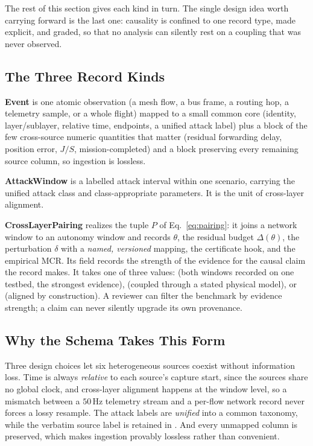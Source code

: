 The rest of this section gives each kind in turn. The single design idea worth
carrying forward is the last one: causality is confined to one record type, made
explicit, and graded, so that no analysis can silently rest on a coupling that
was never observed.

\subsection{The Three Record Kinds}
\textbf{Event} is one atomic observation (a mesh flow, a bus frame, a routing
hop, a telemetry sample, or a whole flight) mapped to a small common core
(identity, layer/sublayer, relative time, endpoints, a unified attack label)
plus a  block of the few cross-source numeric quantities that
matter (residual forwarding delay, position error, $J/S$, mission-completed) and
a  block preserving every remaining source column, so ingestion is
lossless.

\textbf{AttackWindow} is a labelled attack interval within one scenario,
carrying the unified attack class and class-appropriate 
parameters. It is the unit of cross-layer alignment.

\textbf{CrossLayerPairing} realizes the tuple $P$ of Eq.~\eqref{eq:pairing}: it
joins a network window to an autonomy window and records $\theta$, the residual
budget $\Delta(\theta)$, the perturbation $\delta$ with a \emph{named,
versioned} mapping, the certificate hook, and the empirical MCR. Its
 field records the strength of the evidence for the
causal claim the record makes. It takes one of three values:
 (both windows recorded on one testbed, the
strongest evidence),  (coupled through a stated physical
model), or  (aligned by construction). A reviewer can
filter the benchmark by evidence strength; a claim can never silently upgrade
its own provenance.

\subsection{Why the Schema Takes This Form}
Three design choices let six heterogeneous sources coexist without information
loss. Time is always \emph{relative} to each source's capture start, since the
sources share no global clock, and cross-layer alignment happens at the window
level, so a mismatch between a $50$\,Hz telemetry stream and a per-flow network
record never forces a lossy resample. The attack labels are \emph{unified} into a common taxonomy, while the verbatim source label is retained in
. And every unmapped column is preserved, which makes
ingestion provably lossless rather than convenient.

